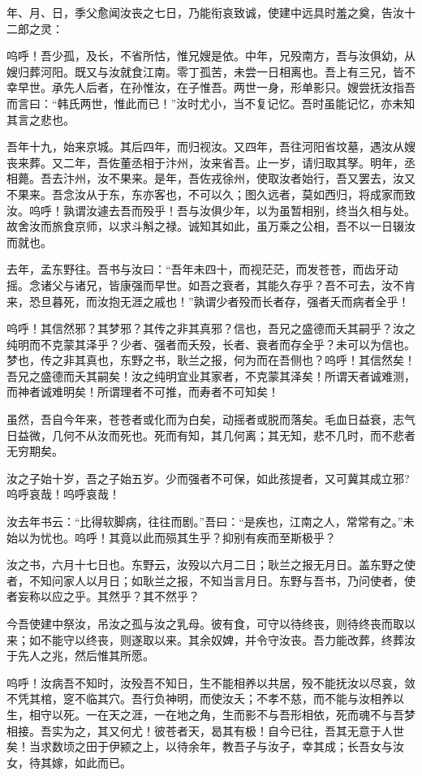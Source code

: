 \documentclass[UTF8,titlepage,oneside]{ctexbook}
\begin{document}
年、月、日，季父愈闻汝丧之七日，乃能衔哀致诚，使建中远具时羞之奠，告汝十二郎之灵：

呜呼！吾少孤，及长，不省所怙，惟兄嫂是依。中年，兄殁南方，吾与汝俱幼，从嫂归葬河阳。既又与汝就食江南。零丁孤苦，未尝一日相离也。吾上有三兄，皆不幸早世。承先人后者，在孙惟汝，在子惟吾。两世一身，形单影只。嫂尝抚汝指吾而言曰：“韩氏两世，惟此而已！”汝时尤小，当不复记忆。吾时虽能记忆，亦未知其言之悲也。

吾年十九，始来京城。其后四年，而归视汝。又四年，吾往河阳省坟墓，遇汝从嫂丧来葬。又二年，吾佐董丞相于汴州，汝来省吾。止一岁，请归取其孥。明年，丞相薨。吾去汴州，汝不果来。是年，吾佐戎徐州，使取汝者始行，吾又罢去，汝又不果来。吾念汝从于东，东亦客也，不可以久；图久远者，莫如西归，将成家而致汝。呜呼！孰谓汝遽去吾而殁乎！吾与汝俱少年，以为虽暂相别，终当久相与处。故舍汝而旅食京师，以求斗斛之禄。诚知其如此，虽万乘之公相，吾不以一日辍汝而就也。

去年，孟东野往。吾书与汝曰：“吾年未四十，而视茫茫，而发苍苍，而齿牙动摇。念诸父与诸兄，皆康强而早世。如吾之衰者，其能久存乎？吾不可去，汝不肯来，恐旦暮死，而汝抱无涯之戚也！”孰谓少者殁而长者存，强者夭而病者全乎！

呜呼！其信然邪？其梦邪？其传之非其真邪？信也，吾兄之盛德而夭其嗣乎？汝之纯明而不克蒙其泽乎？少者、强者而夭殁，长者、衰者而存全乎？未可以为信也。梦也，传之非其真也，东野之书，耿兰之报，何为而在吾侧也？呜呼！其信然矣！吾兄之盛德而夭其嗣矣！汝之纯明宜业其家者，不克蒙其泽矣！所谓天者诚难测，而神者诚难明矣！所谓理者不可推，而寿者不可知矣！

虽然，吾自今年来，苍苍者或化而为白矣，动摇者或脱而落矣。毛血日益衰，志气日益微，几何不从汝而死也。死而有知，其几何离；其无知，悲不几时，而不悲者无穷期矣。

汝之子始十岁，吾之子始五岁。少而强者不可保，如此孩提者，又可冀其成立邪?呜呼哀哉！呜呼哀哉！

汝去年书云：“比得软脚病，往往而剧。”吾曰：“是疾也，江南之人，常常有之。”未始以为忧也。呜呼！其竟以此而殒其生乎？抑别有疾而至斯极乎？

汝之书，六月十七日也。东野云，汝殁以六月二日；耿兰之报无月日。盖东野之使者，不知问家人以月日；如耿兰之报，不知当言月日。东野与吾书，乃问使者，使者妄称以应之乎。其然乎？其不然乎？

今吾使建中祭汝，吊汝之孤与汝之乳母。彼有食，可守以待终丧，则待终丧而取以来；如不能守以终丧，则遂取以来。其余奴婢，并令守汝丧。吾力能改葬，终葬汝于先人之兆，然后惟其所愿。

呜呼！汝病吾不知时，汝殁吾不知日，生不能相养以共居，殁不能抚汝以尽哀，敛不凭其棺，窆不临其穴。吾行负神明，而使汝夭；不孝不慈，而不能与汝相养以生，相守以死。一在天之涯，一在地之角，生而影不与吾形相依，死而魂不与吾梦相接。吾实为之，其又何尤！彼苍者天，曷其有极！自今已往，吾其无意于人世矣！当求数顷之田于伊颍之上，以待余年，教吾子与汝子，幸其成；长吾女与汝女，待其嫁，如此而已。
\end{document}
